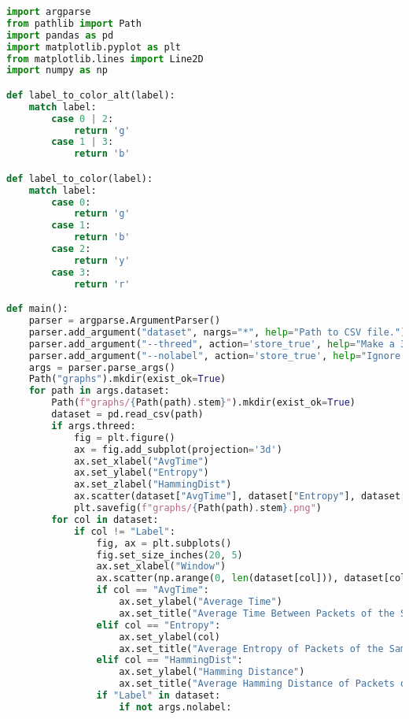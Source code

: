 \begin{lstlisting}[language=Python]
import argparse
from pathlib import Path
import pandas as pd
import matplotlib.pyplot as plt
from matplotlib.lines import Line2D
import numpy as np

def label_to_color_alt(label):
    match label:
        case 0 | 2:
            return 'g'
        case 1 | 3:
            return 'b'

def label_to_color(label):
    match label:
        case 0:
            return 'g'
        case 1:
            return 'b'
        case 2:
            return 'y'
        case 3:
            return 'r'

def main():
    parser = argparse.ArgumentParser()
    parser.add_argument("dataset", nargs="*", help="Path to CSV file.")
    parser.add_argument("--threed", action='store_true', help="Make a 3d scatterplot.")
    parser.add_argument("--nolabel", action='store_true', help="Ignore labels.")
    args = parser.parse_args()
    Path("graphs").mkdir(exist_ok=True)
    for path in args.dataset:
        Path(f"graphs/{Path(path).stem}").mkdir(exist_ok=True)
        dataset = pd.read_csv(path)
        if args.threed:
            fig = plt.figure()
            ax = fig.add_subplot(projection='3d')
            ax.set_xlabel("AvgTime")
            ax.set_ylabel("Entropy")
            ax.set_zlabel("HammingDist")
            ax.scatter(dataset["AvgTime"], dataset["Entropy"], dataset["HammingDist"], c = dataset["Label"].apply(label_to_color_alt if args.nolabel else label_to_color).values if "Label" in dataset else "c")
            plt.savefig(f"graphs/{Path(path).stem}.png")
        for col in dataset:
            if col != "Label":
                fig, ax = plt.subplots()
                fig.set_size_inches(20, 5)
                ax.set_xlabel("Window")
                ax.scatter(np.arange(0, len(dataset[col])), dataset[col], c = dataset["Label"].apply(label_to_color_alt if args.nolabel else label_to_color).values if "Label" in dataset else "c")
                if col == "AvgTime":
                    ax.set_ylabel("Average Time")
                    ax.set_title("Average Time Between Packets of the Same ID")
                elif col == "Entropy":
                    ax.set_ylabel(col)
                    ax.set_title("Average Entropy of Packets of the Same ID")
                elif col == "HammingDist":
                    ax.set_ylabel("Hamming Distance")
                    ax.set_title("Average Hamming Distance of Packets of the Same ID")
                if "Label" in dataset:
                    if not args.nolabel:

\end{lstlisting}
